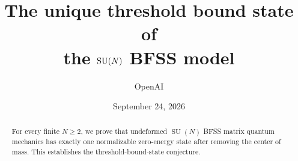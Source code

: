 \documentclass[11pt]{article}
\title{The unique threshold bound state of\texorpdfstring{\\}{ }the \(\SU(N)\) BFSS model}
\author{OpenAI}
\date{September 24, 2026}
\numberwithin{equation}{section}
\theoremstyle{definition}
\theoremstyle{remark}
\DeclareMathOperator{\SU}{SU}
\begin{document}
\maketitle
\begin{abstract}
For every finite \(N\ge2\), we prove that undeformed \(\SU(N)\) BFSS matrix
quantum mechanics has exactly one normalizable zero-energy state after
removing the center of mass. This establishes the threshold-bound-state
conjecture.
\end{abstract}

\tableofcontents
\clearpage











\end{document}
